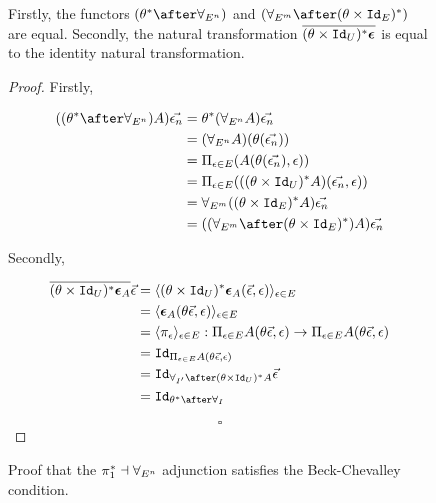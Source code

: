 \documentclass{Report}
\begin{document}
\begin{figure}
    \begin{framed}
        
\begin{theorem}
    Firstly, the functors $(\theta\star\after\allEn)$ and $(\allEm\after(\theta\times\Id{E})\star)$ are equal. Secondly, the natural transformation $\overline{(\theta\times\texttt{Id}_{U})^* \boldsymbol{\epsilon}_{}}$ is equal to the identity natural transformation.
\end{theorem}

    \begin{proof}

        Firstly,

    \begin{align*}
    ((\theta\star\after\allEn)A)\env &= \theta\star(\allEn  A)\env\\
        &= (\allEn A)(\theta(\env))\\
        &= \Pi_{\e\in E}(A(\theta(\env), \e))\\
    &= \Pi_{\e\in E}(((\theta\times \Id{U})\star A)(\env,   \e))\\
        &= \allEm((\theta\times\Id{E})\star A)\env\\
        &= ((\allEm\after(\theta\times\Id{E})\star)A)\env
    \end{align*}

Secondly,
    
\begin{align*}
    \bar{(\theta\times\Id{U})\star \counit{A}} \ev  & = \finpr{(\theta\times\Id{U})\star\counit{A}(\ev, \e)}{\e\in E}\\
    & = \finpr{\counit{A}(\theta\ev, \e)}{\e\in E}\\
    & = \finpr{\pi_\e}{\e\in E}: \Pi_{\e\in E}A(\theta\ev, \e) \rightarrow \Pi_{\e\in E}A(\theta\ev, \e)\\
    & = \Id{\Pi_{\e\in E}A(\theta\ev, \e)}\\
    & = \Id{\allII\after(\theta\times\Id{U})\star A}\ev\\
    & = \Id{\theta\star\after\allI}
\end{align*}

    $$\square$$
    \end{proof}
    \end{framed}
    \caption{Proof that the $\pi_1^* \dashv \forall_{E^n}$ adjunction satisfies the Beck-Chevalley condition.}
    \label{BeckChevalley1}
\end{figure}
\end{document}
